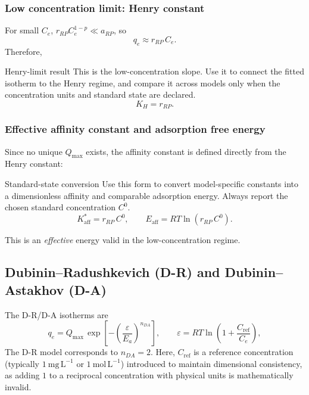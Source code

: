 \documentclass[journal=jacsat,manuscript=article]{achemso}
\begin{document}
\subsubsection{Low concentration limit: Henry constant}

For small $C_e$, $r_{RP}C_e^{1-p} \ll a_{RP}$, so
\begin{equation}
	q_e \approx r_{RP}\, C_e.
\end{equation}
Therefore,
\begin{greenbox}{Henry-limit result}
	This is the low-concentration slope. Use it to connect the fitted isotherm to the Henry regime, and compare it across models only when the concentration units and standard state are declared.
\begin{equation}
	K_H = r_{RP}.
\end{equation}
\end{greenbox}

\subsubsection{Effective affinity constant and adsorption free energy}

Since no unique $Q_{\max}$ exists, the affinity constant is defined directly from the Henry constant:
\begin{greenbox}{Standard-state conversion}
	Use this form to convert model-specific constants into a dimensionless affinity and comparable adsorption energy. Always report the chosen standard concentration \(C^0\).
\begin{equation}
	K_{\mathrm{aff}}^{\ast} = r_{RP}\, C^0,
		\qquad
		E_{\mathrm{aff}} = RT\ln(r_{RP}\, C^0).
\end{equation}
\end{greenbox}
This is an \emph{effective} energy valid in the low-concentration regime.

\subsection{Dubinin--Radushkevich (D-R) and Dubinin--Astakhov (D-A)}
\label{sec:si_dr_da}

The D-R/D-A isotherms are
\begin{equation}
	q_e = Q_{\max}\,\exp\!\left[-\left(\frac{\varepsilon}{E_a}\right)^{n_{DA}}\right],
	\qquad
	\varepsilon = RT\ln\!\left(1 + \frac{C_{\mathrm{ref}}}{C_e}\right),
	\label{eq:si_dr_da}
\end{equation}
The D-R model corresponds to $n_{DA} = 2$.
Here, $C_{\mathrm{ref}}$ is a reference concentration (typically $1~\mathrm{mg\,L^{-1}}$ or $1~\mathrm{mol\,L^{-1}}$) introduced to maintain dimensional consistency, as adding $1$ to a reciprocal concentration with physical units is mathematically invalid.
\end{document}
